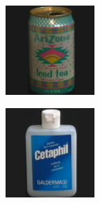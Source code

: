\begin{figure}[tbp]
    \begin{subfigure}{80pt}
        \centering
    \includegraphics[width=\textwidth]{figures/coil_original/7.png}
    \caption{}
	\end{subfigure}
	\begin{subfigure}{80pt}
        \centering
    \includegraphics[width=\textwidth]{figures/coil_original/13.png}

\end{subfigure}
\end{figure}
